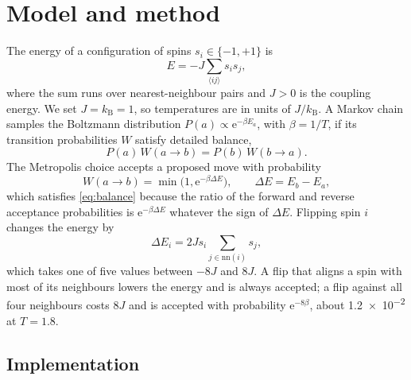 \section{Model and method}
\label{sec:method}

The energy of a configuration of spins $s_i \in \{-1, +1\}$ is
\begin{equation}
  E = -J \sum_{\langle ij \rangle} s_i s_j ,
  \label{eq:hamiltonian}
\end{equation}
where the sum runs over nearest-neighbour pairs and $J > 0$ is the coupling energy. We set $J = k_\mathrm{B} = 1$, so temperatures are in units of $J/k_\mathrm{B}$. A Markov chain samples the Boltzmann distribution $P(a) \propto \mathrm{e}^{-\beta E_a}$, with $\beta = 1/T$, if its transition probabilities $W$ satisfy detailed balance,
\begin{equation}
  P(a)\, W(a \to b) = P(b)\, W(b \to a) .
  \label{eq:balance}
\end{equation}
The Metropolis choice accepts a proposed move with probability
\begin{equation}
  W(a \to b) = \min\bigl(1, \mathrm{e}^{-\beta \Delta E}\bigr), \qquad \Delta E = E_b - E_a ,
  \label{eq:metropolis}
\end{equation}
which satisfies \cref{eq:balance} because the ratio of the forward and reverse acceptance probabilities is $\mathrm{e}^{-\beta \Delta E}$ whatever the sign of $\Delta E$. Flipping spin $i$ changes the energy by
\begin{equation}
  \Delta E_i = 2 J s_i \sum_{j \in \mathrm{nn}(i)} s_j ,
  \label{eq:flip}
\end{equation}
which takes one of five values between $-8J$ and $8J$. A flip that aligns a spin with most of its neighbours lowers the energy and is always accepted; a flip against all four neighbours costs $8J$ and is accepted with probability $\mathrm{e}^{-8\beta}$, about \num{1.2e-2} at $T = 1.8$.

\subsection{Implementation}

